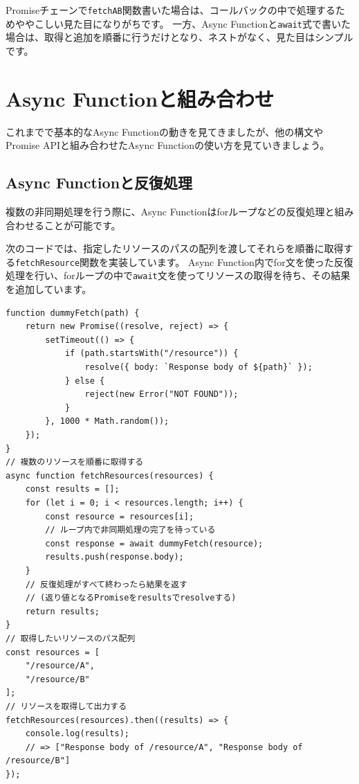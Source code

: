 Promiseチェーンで\texttt{fetchAB}関数書いた場合は、コールバックの中で処理するためややこしい見た目になりがちです。
一方、Async
Functionと\texttt{await}式で書いた場合は、取得と追加を順番に行うだけとなり、ネストがなく、見た目はシンプルです。

\hypertarget{async-function-conbination}{%
\section{Async Functionと組み合わせ}\label{async-function-conbination}}

これまでで基本的なAsync
Functionの動きを見てきましたが、他の構文やPromise APIと組み合わせたAsync
Functionの使い方を見ていきましょう。

\hypertarget{async-function-array}{%
\subsection{Async Functionと反復処理}\label{async-function-array}}

複数の非同期処理を行う際に、Async
Functionはforループなどの反復処理と組み合わせることが可能です。

次のコードでは、指定したリソースのパスの配列を渡してそれらを順番に取得する\texttt{fetchResource}関数を実装しています。
Async
Function内でfor文を使った反復処理を行い、forループの中で\texttt{await}文を使ってリソースの取得を待ち、その結果を追加しています。

\begin{lstlisting}
function dummyFetch(path) {
    return new Promise((resolve, reject) => {
        setTimeout(() => {
            if (path.startsWith("/resource")) {
                resolve({ body: `Response body of ${path}` });
            } else {
                reject(new Error("NOT FOUND"));
            }
        }, 1000 * Math.random());
    });
}
// 複数のリソースを順番に取得する
async function fetchResources(resources) {
    const results = [];
    for (let i = 0; i < resources.length; i++) {
        const resource = resources[i];
        // ループ内で非同期処理の完了を待っている
        const response = await dummyFetch(resource);
        results.push(response.body);
    }
    // 反復処理がすべて終わったら結果を返す
    // (返り値となるPromiseをresultsでresolveする)
    return results;
}
// 取得したいリソースのパス配列
const resources = [
    "/resource/A",
    "/resource/B"
];
// リソースを取得して出力する
fetchResources(resources).then((results) => {
    console.log(results); 
    // => ["Response body of /resource/A", "Response body of /resource/B"]
});
\end{lstlisting}

